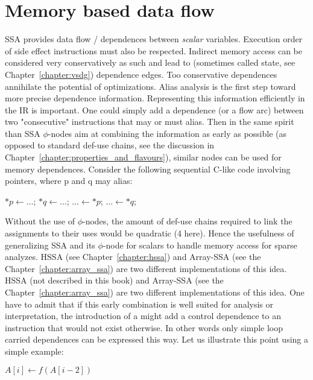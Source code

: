 \section{Memory based data flow}
SSA provides data flow / dependences between \emph{scalar} variables. 
Execution order of side effect instructions must also be respected. 
Indirect memory access can be considered very conservatively as such and lead to (sometimes called state, see Chapter~\ref{chapter:vsdg}) dependence edges. 
Too conservative dependences annihilate the potential of optimizations. 
Alias analysis is the first step toward more precise dependence information. 
Representing this information efficiently in the IR is important. 
One could simply add a dependence (or a flow arc) between two "consecutive" instructions that may or must alias. 
Then in the same spirit than SSA $\phi$-nodes aim at combining the information as early as possible (as opposed to standard def-use chains, see the discussion in Chapter~\ref{chapter:properties_and_flavours}), similar nodes can be used for memory dependences. 
Consider the following sequential C-like code involving pointers, where p and q may alias:

{
\LinesNotNumbered
\qquad\qquad
\begin{algorithm}[H]
$*p \gets \ldots$; \quad
$*q \gets \ldots$; \quad
$\ldots \gets *p$; \quad
$\ldots \gets *q$;
\end{algorithm}
}

\noindent
Without the use of $\phi$-nodes, the amount of def-use chains required to link the assignments to their uses would be quadratic (4 here). 
Hence the usefulness of generalizing SSA and its $\phi$-node for scalars to handle memory access for sparse analyzes. 
\ifhssa
HSSA (see Chapter~\ref{chapter:hssa}) and Array-SSA (see the Chapter~\ref{chapter:array_ssa}) are two different implementations of this idea.
\else
HSSA (not described in this book) and Array-SSA (see the Chapter~\ref{chapter:array_ssa}) are two different implementations of this idea.
\fi
One have to admit that if this early combination is well suited for analysis or interpretation, the introduction of a \phifun might add a control dependence to an instruction that would not exist otherwise. 
In other words only simple loop carried dependences can be expressed this way. 
Let us illustrate this point using a simple example:

{
\LinesNotNumbered
\begin{algorithm}[H]
   {
    $ A[i] \gets f(A[i-2])$\;
  }
\end{algorithm}
}

